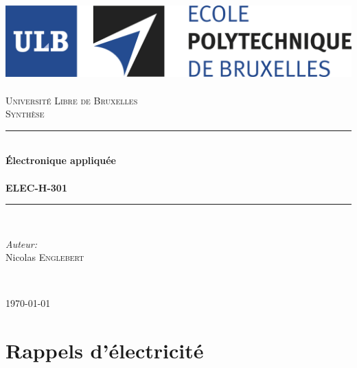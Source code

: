 \documentclass	[11pt, a4paper, openany]{book}
\begin{document}
\renewcommand{\proofname}{Démonstration}
\frontmatter
\begin{titlepage}
\begin{center}	
	
	\newcommand{\HRule}{\rule{\linewidth}{0.5mm}}   			%
	\includegraphics[scale=0.11]{logo.jpg}~\\[1cm]				%

	\textsc{\LARGE Université Libre de Bruxelles}\\[1.5cm]
	\textsc{\Large Synthèse}\\[0.5cm]

	\HRule \\[0.4cm]
	{ \huge \bfseries Électronique appliquée \\ \ \\ ELEC-H-301 \\[0.4cm] }


	\HRule \\[1.5cm]
		\begin{minipage}{0.4\textwidth}
		\begin{flushleft} \large
		
		\emph{Auteur:}\\
			Nicolas \textsc{Englebert}\\
			\end{flushleft}
			\end{minipage}
			\begin{minipage}{0.4\textwidth}
			\begin{flushright} \large
			\emph{} \\		
			\textsc{}
			\end{flushright}
		\end{minipage}

	\vfill

{\large \today}

\end{center}
\end{titlepage}
\tableofcontents



\mainmatter
\part{Rappels d'électricité}
\end{document}
